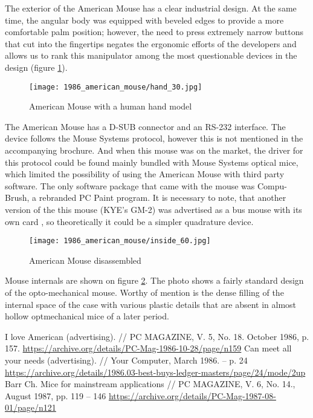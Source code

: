 \documentclass[11pt, a4paper]{article}
\begin{document}
The exterior of the American Mouse has a clear industrial design. At the same time, the angular body was equipped with beveled edges to provide a more comfortable palm position; however, the need to press extremely narrow buttons that cut into the fingertips negates the ergonomic efforts of the developers and allows us to rank this manipulator among the most questionable devices in the design (figure \ref{fig:AmericanHand}).

\begin{figure}[h]
    \centering
    \texttt{[image: 1986\_american\_mouse/hand\_30.jpg]}
    \caption{American Mouse with a human hand model}
    \label{fig:AmericanHand}
\end{figure}

The American Mouse has a D-SUB connector and an RS-232 interface. The device follows the Mouse Systems protocol, however this is not mentioned in the accompanying brochure. And when this mouse was on the market, the driver for this protocol could be found mainly bundled with Mouse Systems optical mice, which limited the possibility of using the American Mouse with third party software. The only software package that came with the mouse was Compu-Brush, a rebranded PC Paint program. It is necessary to note, that another version of the this mouse (KYE's GM-2) was advertised as a bus mouse with its own card \cite{kye}, so theoretically it could be a simpler quadrature device.

\begin{figure}[h]
    \centering
    \texttt{[image: 1986\_american\_mouse/inside\_60.jpg]}
    \caption{American Mouse disassembled}
    \label{fig:AmericanInside}
\end{figure}

Mouse internals are shown on figure \ref{fig:AmericanInside}. The photo shows a fairly standard design of the opto-mechanical mouse. Worthy of mention is the dense filling of the internal space of the case with various plastic details that are absent in almost hollow optmechanical mice of a later period.

\begin{thebibliography}{9}
 I love American (advertising). // PC MAGAZINE, V. 5, No. 18. October 1986, p. 157. \url{https://archive.org/details/PC-Mag-1986-10-28/page/n159}
 Can meet all your needs (advertising). // Your Computer, March 1986. -- p. 24 \url{https://archive.org/details/1986.03-best-buys-ledger-masters/page/24/mode/2up}
 Barr Ch. Mice for mainstream applications // PC MAGAZINE, V. 6, No. 14., August 1987, pp. 119 – 146 \url{https://archive.org/details/PC-Mag-1987-08-01/page/n121}
\end{thebibliography}
\end{document}

